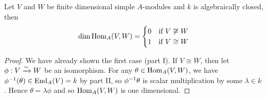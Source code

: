 \begin{thm}
	Let $V$ and $W$ be finite dimensional simple $A$-modules and $k$ is algebraically closed, then
	\[
		\dim \operatorname{Hom}_A(V,W)=
		\begin{cases}
			0 & \text{if } V \not\cong W \\
			1 & \text{if } V \cong W
		\end{cases}
	\]
\end{thm}

\begin{proof}
	We have already shown the first case (part I).
	If $V \cong W$, then let $\phi: V \xrightarrow{\sim} W$ be an isomorphism.
	For any $\theta \in \operatorname{Hom}_A(V,W)$, we have $\phi^{-1}(\theta) \in \operatorname{End}_A(V) = k$ by part II, so $\phi^{-1}\theta$ is scalar multiplication by some $\lambda \in k$.
	Hence $\theta=\lambda\phi$ and so $\operatorname{Hom}_A(V,W)$ is one dimensional.
\end{proof}